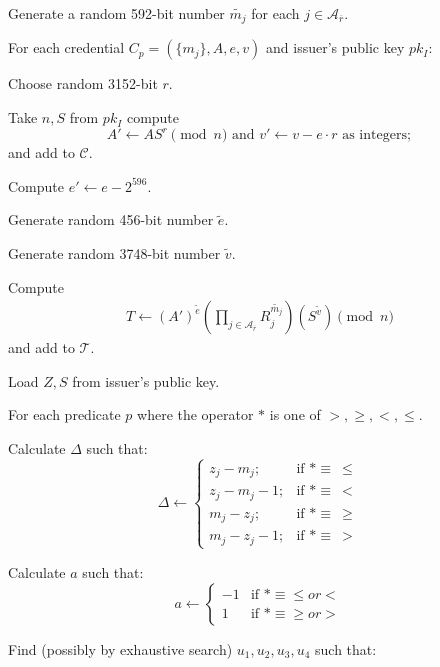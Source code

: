 \documentclass[a4paper]{article}
\begin{document}
\begin{legal}
\item Generate a random 592-bit number $\widetilde{m_j}$ for each $j \in \mathcal{A}_{\overline{r}}$.
\item For each credential $C_p = (\{m_j\},A,e,v)$ and issuer's
public key $pk_I$:
\begin{legal}
\item Choose random 3152-bit $r$.
\item Take $n,S$ from $pk_I$ compute
\begin{equation}\label{eq:aprime}
A' \leftarrow A S^{r}\pmod{n}
\text{ and } v' \leftarrow v - e\cdot r\text{ as integers};
\end{equation}
and add to $\mathcal{C}$.
\item Compute $e' \leftarrow e - 2^{596}$.
\item Generate random 456-bit number $\widetilde{e}$.
\item Generate random 3748-bit number $\widetilde{v}$.
\item Compute
\begin{align}
T \leftarrow (A')^{\widetilde{e}}\left(\prod_{j\in \mathcal{A}_{\overline{r}}} R_j^{\widetilde{m_j}}\right)(S^{\widetilde{v}})\pmod{n}
\end{align}
and add to $\mathcal{T}$.
\end{legal}
\item Load $Z,S$ from issuer's public key.
\item For each predicate $p$ where the operator $*$ is one of $>, \geq, <, \leq$.
\begin{legal}
\item Calculate $\Delta$ such that:
$$
\Delta \leftarrow \begin{cases}
z_j-m_j; & \mbox{if } * \equiv\ \leq\\
z_j-m_j-1; & \mbox{if } * \equiv\ <\\
m_j-z_j; & \mbox{if } * \equiv\ \geq\\
m_j-z_j-1; & \mbox{if } * \equiv\ >
\end{cases}
$$
\item Calculate $a$ such that:
$$
a \leftarrow \begin{cases}
-1 & \mbox{if } * \equiv \leq or <\\
1  & \mbox{if } * \equiv \geq or >
\end{cases}
$$
 \item Find (possibly by exhaustive search) $u_1, u_2,u_3, u_4$ such that:
 \begin{align}

\end{align}
\end{legal}
\end{legal}
\end{document}
